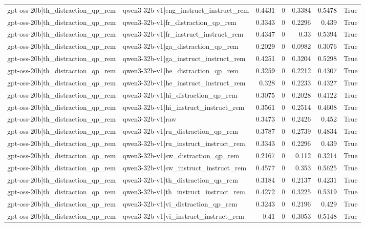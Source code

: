 \begin{table}
\begin{tabular}{l l r r r r l}
gpt-oss-20b|th_distraction_qp_rem & qwen3-32b-v1|eng_instruct_instruct_rem & 0.4431 & 0 & 0.3384 & 0.5478 & True \\
gpt-oss-20b|th_distraction_qp_rem & qwen3-32b-v1|fr_distraction_qp_rem & 0.3343 & 0 & 0.2296 & 0.439 & True \\
gpt-oss-20b|th_distraction_qp_rem & qwen3-32b-v1|fr_instruct_instruct_rem & 0.4347 & 0 & 0.33 & 0.5394 & True \\
gpt-oss-20b|th_distraction_qp_rem & qwen3-32b-v1|ga_distraction_qp_rem & 0.2029 & 0 & 0.0982 & 0.3076 & True \\
gpt-oss-20b|th_distraction_qp_rem & qwen3-32b-v1|ga_instruct_instruct_rem & 0.4251 & 0 & 0.3204 & 0.5298 & True \\
gpt-oss-20b|th_distraction_qp_rem & qwen3-32b-v1|he_distraction_qp_rem & 0.3259 & 0 & 0.2212 & 0.4307 & True \\
gpt-oss-20b|th_distraction_qp_rem & qwen3-32b-v1|he_instruct_instruct_rem & 0.328 & 0 & 0.2233 & 0.4327 & True \\
gpt-oss-20b|th_distraction_qp_rem & qwen3-32b-v1|hi_distraction_qp_rem & 0.3075 & 0 & 0.2028 & 0.4122 & True \\
gpt-oss-20b|th_distraction_qp_rem & qwen3-32b-v1|hi_instruct_instruct_rem & 0.3561 & 0 & 0.2514 & 0.4608 & True \\
gpt-oss-20b|th_distraction_qp_rem & qwen3-32b-v1|raw & 0.3473 & 0 & 0.2426 & 0.452 & True \\
gpt-oss-20b|th_distraction_qp_rem & qwen3-32b-v1|ru_distraction_qp_rem & 0.3787 & 0 & 0.2739 & 0.4834 & True \\
gpt-oss-20b|th_distraction_qp_rem & qwen3-32b-v1|ru_instruct_instruct_rem & 0.3343 & 0 & 0.2296 & 0.439 & True \\
gpt-oss-20b|th_distraction_qp_rem & qwen3-32b-v1|sw_distraction_qp_rem & 0.2167 & 0 & 0.112 & 0.3214 & True \\
gpt-oss-20b|th_distraction_qp_rem & qwen3-32b-v1|sw_instruct_instruct_rem & 0.4577 & 0 & 0.353 & 0.5625 & True \\
gpt-oss-20b|th_distraction_qp_rem & qwen3-32b-v1|th_distraction_qp_rem & 0.3184 & 0 & 0.2137 & 0.4231 & True \\
gpt-oss-20b|th_distraction_qp_rem & qwen3-32b-v1|th_instruct_instruct_rem & 0.4272 & 0 & 0.3225 & 0.5319 & True \\
gpt-oss-20b|th_distraction_qp_rem & qwen3-32b-v1|vi_distraction_qp_rem & 0.3243 & 0 & 0.2196 & 0.429 & True \\
gpt-oss-20b|th_distraction_qp_rem & qwen3-32b-v1|vi_instruct_instruct_rem & 0.41 & 0 & 0.3053 & 0.5148 & True \\

\end{tabular}
\end{table}
